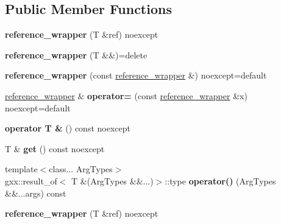 \subsection*{Public Member Functions}
\begin{DoxyCompactItemize}
\item 
{\bfseries reference\+\_\+wrapper} (T \&ref) noexcept\hypertarget{classreference__wrapper_a90ff9c36e61542fcce0a7e9a14062753}{}\label{classreference__wrapper_a90ff9c36e61542fcce0a7e9a14062753}

\item 
{\bfseries reference\+\_\+wrapper} (T \&\&)=delete\hypertarget{classreference__wrapper_a231d62c5ab9c807133576019a0bc0987}{}\label{classreference__wrapper_a231d62c5ab9c807133576019a0bc0987}

\item 
{\bfseries reference\+\_\+wrapper} (const \hyperlink{classreference__wrapper}{reference\+\_\+wrapper} \&) noexcept=default\hypertarget{classreference__wrapper_a03d768dd684230e4977df453f72a85fd}{}\label{classreference__wrapper_a03d768dd684230e4977df453f72a85fd}

\item 
\hyperlink{classreference__wrapper}{reference\+\_\+wrapper} \& {\bfseries operator=} (const \hyperlink{classreference__wrapper}{reference\+\_\+wrapper} \&x) noexcept=default\hypertarget{classreference__wrapper_ab4fd4bd5b9ca7170c18ddbfaeef2231b}{}\label{classreference__wrapper_ab4fd4bd5b9ca7170c18ddbfaeef2231b}

\item 
{\bfseries operator T \&} () const noexcept\hypertarget{classreference__wrapper_a7cb31b103c769a40a34a43be82763249}{}\label{classreference__wrapper_a7cb31b103c769a40a34a43be82763249}

\item 
T \& {\bfseries get} () const noexcept\hypertarget{classreference__wrapper_ad8c27099d67bb228fcc7f722214bd231}{}\label{classreference__wrapper_ad8c27099d67bb228fcc7f722214bd231}

\item 
{\footnotesize template$<$class... Arg\+Types$>$ }\\gxx\+::result\+\_\+of$<$ T \&(Arg\+Types \&\&...)$>$\+::type {\bfseries operator()} (Arg\+Types \&\&...args) const \hypertarget{classreference__wrapper_a04cb437b88832621e82e34f6dcd8743a}{}\label{classreference__wrapper_a04cb437b88832621e82e34f6dcd8743a}

\item 
{\bfseries reference\+\_\+wrapper} (T \&ref) noexcept\hypertarget{classreference__wrapper_a90ff9c36e61542fcce0a7e9a14062753}{}\label{classreference__wrapper_a90ff9c36e61542fcce0a7e9a14062753}


\end{DoxyCompactItemize}
